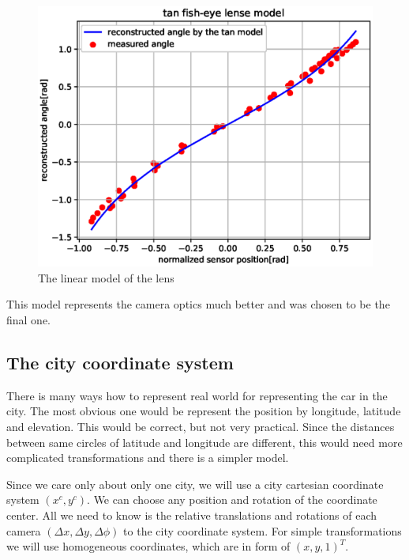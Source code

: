 \documentclass[a4paper,12pt,titlepage]{article}
\numberwithin{figure}{section}
\begin{document}
\begin{figure}[h!]
\centering
\includegraphics[width=1\linewidth]{fig/tan_model2.eps}
\caption{The linear model of the lens}
\label{fig:linear_model}
\end{figure}

This model represents the camera optics much better and was chosen to be the final one.

\subsection{The city coordinate system}

There is many ways how to represent real world for representing the car in the city. The most obvious one would be represent the position by longitude, latitude and elevation. This would be correct, but not very practical. Since the distances between same circles of latitude and longitude are different, this would need more complicated transformations and there is a simpler model. 

Since we care only about only one city, we will use a city cartesian coordinate system $(x^c, y^c)$. We can choose any position and rotation of the coordinate center. All we need to know is the relative translations and rotations of each camera $(\Delta x, \Delta y, \Delta\phi)$ to the city coordinate system. For simple transformations we will use homogeneous coordinates, which are in form of $(x, y, 1)^T$. 
\end{document}
